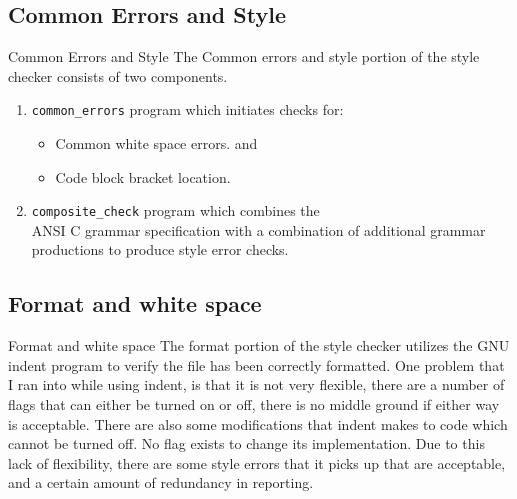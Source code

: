 \documentclass[compress]{beamer}
\begin{document}
\subsection{Common Errors and Style}
\begin{frame}{Common Errors and Style}
The Common errors and style portion of the style checker consists of two components.
\begin{enumerate}
    \item  \textcolor{hsrmSec2}{\texttt{common\_errors}} program which initiates checks for:
        \begin{itemize}
            \item Common white space errors. and
            \item Code block bracket location.
        \end{itemize}
    \item  \textcolor{hsrmSec2}{\texttt{composite\_check}} program which combines the \\
            ANSI C grammar specification with a combination of additional 
            grammar productions to produce style error checks.  
\end{enumerate}

\end{frame}


\subsection{Format and white space}
\begin{frame}{Format and white space}
The format portion of the style checker utilizes the GNU indent program to verify the file has been correctly formatted.
\note
{
    One problem that I ran into while using indent, is that it is not very flexible, there are a number of flags that can either be
    turned on or off, there is no middle ground if either way is acceptable.
    There are also some modifications that indent makes to code which cannot be turned off. No flag exists to change its implementation.
    Due to this lack of flexibility, there are some style errors that it picks up that are acceptable, and a certain amount of redundancy
    in reporting.
}
\end{frame}
\end{document}
